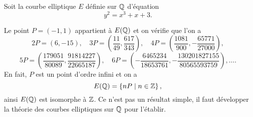 \begin{exemple}
    \label{ex:2PdansQ}
    
    Soit la courbe elliptique $E$ définie sur $\mathbb{Q}$ d'équation
    \[
    y^2 = x^3 + x + 3
    .\] 

    Le point $P = (-1,1)$ appartient à $E(\mathbb{Q})$ et on vérifie que l'on a
    \[
    2P = \left( 6,-15 \right) ,\quad 3P = \left( \frac{11}{49},\frac{617}{343} \right)
    ,\quad 4P = \left( \frac{1081}{900},-\frac{65771}{27000} \right) 
    ,\] 
    \[
    5P = \left( \frac{179051}{80089},\frac{91814227}{22665187} \right)
    , \quad 6P = \left( -\frac{6465234}{18653761},-\frac{130201827155}{80565593759}
    \right), \ldots
    .\] 
    En fait, $P$ est un point d'ordre infini et on a
    \[
    E(\mathbb{Q}) = \left\{ nP \mid n \in \mathbb{Z} \right\} 
    ,\] 
    ainsi $E(\mathbb{Q})$ est isomorphe à $\mathbb{Z}$. Ce n'est pas un résultat simple, il faut
    développer la théorie des courbes elliptiques sur $\mathbb{Q}$ pour l'établir.
\end{exemple}

